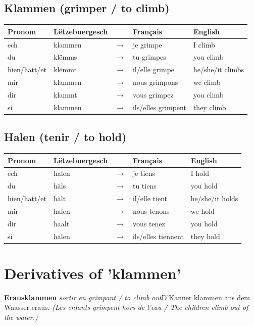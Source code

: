 \subsection*{Klammen (grimper / to climb)}
\begin{tabular}{ll c l l}
\toprule
\textbf{Pronom} & \textbf{Lëtzebuergesch} & \textbf{} & \textbf{Français} & \textbf{English} \\
\midrule
ech & klammen & $\rightarrow$ & je grimpe & I climb \\
du & klëmms & $\rightarrow$ & tu grimpes & you climb \\
hien/hatt/et & klëmmt & $\rightarrow$ & il/elle grimpe & he/she/it climbs \\
mir & klammen & $\rightarrow$ & nous grimpons & we climb \\
dir & klammt & $\rightarrow$ & vous grimpez & you climb \\
si & klammen & $\rightarrow$ & ils/elles grimpent & they climb \\
\bottomrule
\end{tabular}

\subsection*{Halen (tenir / to hold)}
\begin{tabular}{ll c l l}
\toprule
\textbf{Pronom} & \textbf{Lëtzebuergesch} & \textbf{} & \textbf{Français} & \textbf{English} \\
\midrule
ech & halen & $\rightarrow$ & je tiens & I hold \\
du & häls & $\rightarrow$ & tu tiens & you hold \\
hien/hatt/et & hält & $\rightarrow$ & il/elle tient & he/she/it holds \\
mir & halen & $\rightarrow$ & nous tenons & we hold \\
dir & haalt & $\rightarrow$ & vous tenez & you hold \\
si & halen & $\rightarrow$ & ils/elles tiennent & they hold \\
\bottomrule
\end{tabular}


\section{Derivatives of 'klammen'}
\textbf{Erausklammen} \textit{sortir en grimpant / to climb out}\newline D'Kanner klammen aus dem Waasser eraus. \textit{(Les enfants grimpent hors de l'eau / The children climb out of the water.)}

